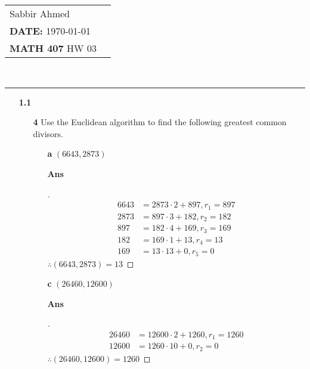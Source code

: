 \documentclass[paper=usletter, fontsize=12pt]{article}
\newcommand{\documentinfo}[5]{
    \begin{centering}
        \parbox{2in}{
        \begin{spacing}{1}
            \begin{flushleft}
                \begin{tabular}{l l}
                    #1 \\
                    #2 \\
                    #3 \\
                \end{tabular}\\
                \rule{\textwidth}{1pt}
            \end{flushleft}
        \end{spacing}
        }
    \end{centering}
}
\begin{document}
    \documentinfo{Sabbir Ahmed}{\textbf{DATE:} \today}{\textbf{MATH 407} HW 03}
    \vspace{-0.2in}

    \begin{itemize}

        \item[\textbf{1.1}]

        \begin{itemize}

            \item[\textbf{4}] Use the Euclidean algorithm to find the
            following greatest common divisors.

            \begin{itemize}

                \item[\textbf{a}] $(6643, 2873)$
                \item[\textbf{Ans}]
                \begin{proof}[\unskip\nopunct]
                    \begin{align*}
                        6643 & = 2873 \cdot 2 + 897, r_1 = 897 \\
                        2873 & = 897 \cdot 3 + 182, r_2 = 182 \\
                        897 & = 182 \cdot 4 + 169, r_3 = 169 \\
                        182 & = 169 \cdot 1 + 13, r_4 = 13 \\
                        169 & = 13 \cdot 13 + 0, r_5 = 0
                    \end{align*}
                    $\therefore (6643, 2873) = 13$ \qedhere
                \end{proof}
                \vspace{0.2in}

                \item[\textbf{c}] $(26460, 12600)$
                \item[\textbf{Ans}]
                \begin{proof}[\unskip\nopunct]
                    \begin{align*}
                        26460 & = 12600 \cdot 2 + 1260, r_1 = 1260 \\
                        12600 & = 1260 \cdot 10 + 0, r_2 = 0
                    \end{align*}
                    $\therefore (26460, 12600) = 1260$ \qedhere
                \end{proof}
                \vspace{0.2in}


\end{itemize}
\end{itemize}
\end{itemize}
\end{document}
